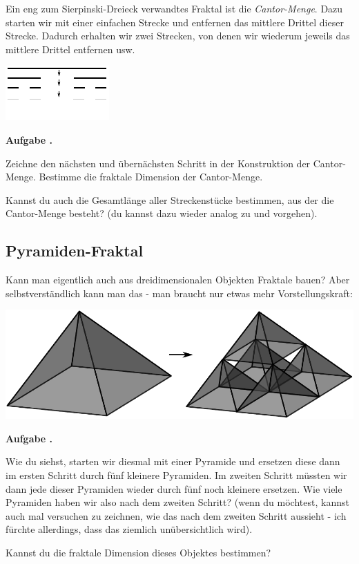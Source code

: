 \documentclass[a4paper,ngerman,12pt]{scrartcl}
\theoremstyle{definition}
\theoremstyle{plain}
\theoremstyle{remark}
\newlength{\aufgabenskip}
\newcounter{aufgabennummer}
\newenvironment{aufgabe}[1]{
  \addtocounter{aufgabennummer}{1}
  \textbf{Aufgabe \theaufgabennummer.} \emph{#1} \par
}{\vspace{\aufgabenskip}}
\begin{document}
Ein eng zum Sierpinski-Dreieck verwandtes Fraktal ist die \emph{Cantor-Menge}. Dazu starten wir mit einer einfachen Strecke und entfernen das mittlere Drittel dieser Strecke. Dadurch erhalten wir zwei Strecken, von denen wir wiederum jeweils das mittlere Drittel entfernen usw.

\begin{center}
	\includegraphics[width=.5\textwidth]{Bilder/Cantor_Menge.pdf}
\end{center}

\newpage

\begin{aufgabe}{}
	Zeichne den nächsten und übernächsten Schritt in der Konstruktion der Cantor-Menge. Bestimme die fraktale Dimension der Cantor-Menge. 
	
	Kannst du auch die Gesamtlänge aller \glqq Streckenstücke\grqq{} bestimmen, aus der die Cantor-Menge besteht? (du kannst dazu wieder analog zu  und  vorgehen).
\end{aufgabe}


\subsection{Pyramiden-Fraktal}

Kann man eigentlich auch aus dreidimensionalen Objekten Fraktale bauen? Aber selbstverständlich kann man das - man braucht nur etwas mehr Vorstellungskraft:

\begin{center}
	\includegraphics[width=.6\textwidth]{Bilder/Pyramiden.pdf}
\end{center}

\begin{aufgabe}{}
	Wie du siehst, starten wir diesmal mit einer Pyramide und ersetzen diese dann im ersten Schritt durch fünf kleinere Pyramiden. Im zweiten Schritt müssten wir dann jede dieser Pyramiden wieder durch fünf noch kleinere ersetzen. Wie viele Pyramiden haben wir also nach dem zweiten Schritt? (wenn du möchtest, kannst auch mal versuchen zu zeichnen, wie das nach dem zweiten Schritt aussieht - ich fürchte allerdings, dass das ziemlich unübersichtlich wird).
	
	Kannst du die fraktale Dimension dieses Objektes bestimmen? 
\end{aufgabe}
	
\end{document}
